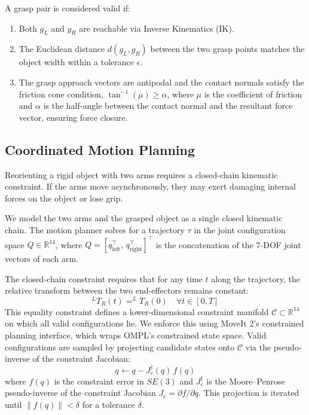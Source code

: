 \documentclass[letterpaper, 10 pt, conference]{ieeeconf}  %
\begin{document}
A grasp pair is considered valid if:
\begin{enumerate}
    \item Both $g_L$ and $g_R$ are reachable via Inverse Kinematics (IK).
    \item The Euclidean distance $d(g_L, g_R)$ between the two grasp points matches the object width within a tolerance $\epsilon$.
    \item The grasp approach vectors are antipodal and the contact normals satisfy the friction cone condition, $\tan^{-1}(\mu) \geq \alpha$, where $\mu$ is the coefficient of friction and $\alpha$ is the half-angle between the contact normal and the resultant force vector, ensuring force closure.
\end{enumerate}

\subsection{Coordinated Motion Planning}
Reorienting a rigid object with two arms requires a closed-chain kinematic constraint. If the arms move asynchronously, they may exert damaging internal forces on the object or lose grip.

We model the two arms and the grasped object as a single closed kinematic chain. The motion planner solves for a trajectory $\tau$ in the joint configuration space $Q \in \mathbb{R}^{14}$, where $Q = [q_{\text{left}}^\top,\, q_{\text{right}}^\top]^\top$ is the concatenation of the 7-DOF joint vectors of each arm.

The closed-chain constraint requires that for any time $t$ along the trajectory, the relative transform between the two end-effectors remains constant:
\begin{equation}
    ^{L}T_{R}(t) = ^{L}T_{R}(0) \quad \forall t \in [0, T]
\end{equation}
This equality constraint defines a lower-dimensional constraint manifold $\mathcal{C} \subset \mathbb{R}^{14}$ on which all valid configurations lie. We enforce this using MoveIt 2's constrained planning interface, which wraps OMPL's constrained state space. Valid configurations are sampled by projecting candidate states onto $\mathcal{C}$ via the pseudo-inverse of the constraint Jacobian:
\begin{equation}
    q \leftarrow q - J_c^{\dagger}(q)\, f(q)
\end{equation}
where $f(q)$ is the constraint error in $SE(3)$ and $J_c^{\dagger}$ is the Moore--Penrose pseudo-inverse of the constraint Jacobian $J_c = \partial f / \partial q$. This projection is iterated until $\|f(q)\| < \delta$ for a tolerance $\delta$.
\end{document}
